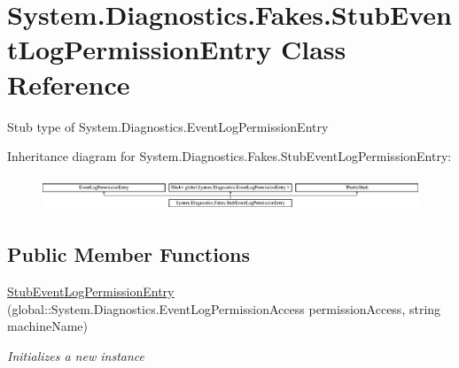 \hypertarget{class_system_1_1_diagnostics_1_1_fakes_1_1_stub_event_log_permission_entry}{\section{System.\-Diagnostics.\-Fakes.\-Stub\-Event\-Log\-Permission\-Entry Class Reference}
\label{class_system_1_1_diagnostics_1_1_fakes_1_1_stub_event_log_permission_entry}
}


Stub type of System.\-Diagnostics.\-Event\-Log\-Permission\-Entry 


Inheritance diagram for System.\-Diagnostics.\-Fakes.\-Stub\-Event\-Log\-Permission\-Entry\-:\begin{figure}[H]
\begin{center}
\leavevmode
\includegraphics[height=1.017257cm]{class_system_1_1_diagnostics_1_1_fakes_1_1_stub_event_log_permission_entry}
\end{center}
\end{figure}
\subsection*{Public Member Functions}
\begin{DoxyCompactItemize}
\item 
\hyperlink{class_system_1_1_diagnostics_1_1_fakes_1_1_stub_event_log_permission_entry_aed9e732a5ff2197f548f357901aec481}{Stub\-Event\-Log\-Permission\-Entry} (global\-::\-System.\-Diagnostics.\-Event\-Log\-Permission\-Access permission\-Access, string machine\-Name)
\begin{DoxyCompactList}\small\item\em Initializes a new instance\end{DoxyCompactList}\end{DoxyCompactItemize}
